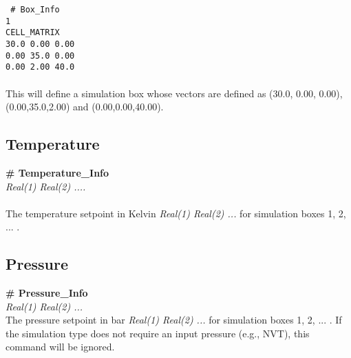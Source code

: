 \texttt{
\# Box\_Info \\
 1 \\
 CELL\_MATRIX \\
 30.0 0.00 0.00\\
 0.00 35.0 0.00\\
 0.00 2.00 40.0}
\\ \\

This will define a simulation box whose vectors are defined as 
(30.0, 0.00, 0.00), (0.00,35.0,2.00) and (0.00,0.00,40.00).

%
%
%
%
%
\subsection{Temperature}\label{sec:Temperature_Info}
{\bf \# Temperature\_Info} \\ 
{\it Real(1) Real(2) .... } \\ \\
%
The temperature setpoint in Kelvin {\it Real(1) Real(2) ... } for simulation
boxes 1, 2, ... .
%
%
\subsection{Pressure}\label{sec:Pressure_Info}
{\bf \# Pressure\_Info} \\
{\it Real(1) Real(2) ... } \\
%
The pressure setpoint in bar {\it Real(1) Real(2) ...} for simulation
boxes 1, 2, ... . If the simulation type does not require an
input pressure (e.g., NVT), this command will be ignored.  
%
%
